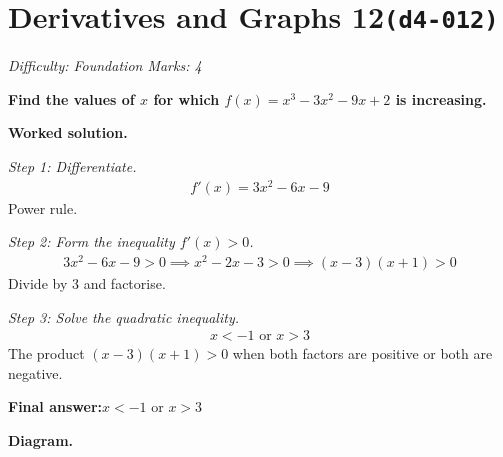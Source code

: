 \documentclass[11pt]{article}
\newcommand{\question}[1]{\par\medskip\noindent\textbf{#1}\par}
\begin{document}
\section*{Derivatives and Graphs 12\quad\small\texttt{(d4-012)}}
\textit{Difficulty: Foundation \quad\textbar\quad Marks: 4}

\question{Find the values of \( x \) for which \( f(x) = x^3 - 3x^2 - 9x + 2 \) is increasing.}

\textbf{Worked solution.}

\textit{Step 1: Differentiate.}
\[\begin{gathered}
f'(x) = 3x^2 - 6x - 9
\end{gathered}\]
Power rule.

\textit{Step 2: Form the inequality \( f'(x) > 0 \).}
\[\begin{gathered}
3x^2 - 6x - 9 > 0 \implies x^2 - 2x - 3 > 0 \implies (x - 3)(x + 1) > 0
\end{gathered}\]
Divide by 3 and factorise.

\textit{Step 3: Solve the quadratic inequality.}
\[\begin{gathered}
x < -1 \text{ or } x > 3
\end{gathered}\]
The product \( (x-3)(x+1) > 0 \) when both factors are positive or both are negative.

\begin{answerbox}
\textbf{Final answer:}\quad \(\displaystyle  x < -1 \) or \(\displaystyle  x > 3 \)
\end{answerbox}
\textbf{Diagram.}
\end{document}
